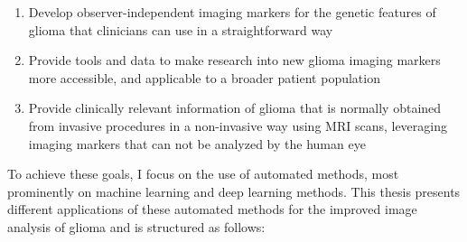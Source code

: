 \begin{enumerate}
\item Develop observer-independent imaging markers for the genetic features of \gls{glioma} that clinicians can use in a straightforward way
\item Provide tools and data to make research into new \gls{glioma} imaging markers more accessible, and applicable to a broader patient population
\item Provide clinically relevant information of \gls{glioma} that is normally obtained from invasive procedures in a non-invasive way using \gls{MRI} scans, leveraging imaging markers that can not be analyzed by the human eye
\end{enumerate}

To achieve these goals, I focus on the use of automated methods, most prominently on machine learning and deep learning methods.
This thesis presents different applications of these automated methods for the improved image analysis of glioma and is structured as follows:

